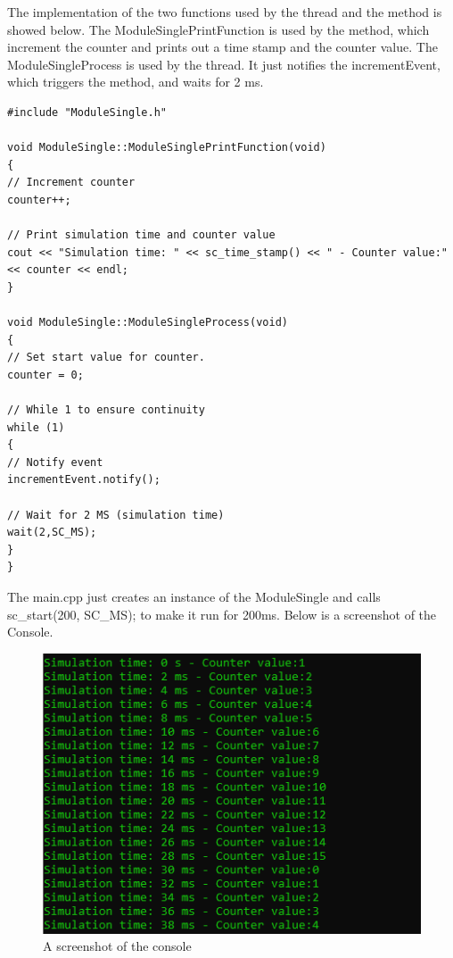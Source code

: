 The implementation of the two functions used by the thread and the method is showed below. 
The ModuleSinglePrintFunction is used by the method, which increment the counter and prints out a time stamp and the counter value.
The ModuleSingleProcess  is used by the thread. It just notifies the incrementEvent, which triggers the method, and waits for 2 ms. 

\begin{lstlisting}
#include "ModuleSingle.h"

void ModuleSingle::ModuleSinglePrintFunction(void)
{
// Increment counter
counter++;

// Print simulation time and counter value
cout << "Simulation time: " << sc_time_stamp() << " - Counter value:" << counter << endl;
}

void ModuleSingle::ModuleSingleProcess(void)
{
// Set start value for counter.
counter = 0;

// While 1 to ensure continuity
while (1)
{
// Notify event
incrementEvent.notify();

// Wait for 2 MS (simulation time)
wait(2,SC_MS);
}
}
\end{lstlisting}


The main.cpp just creates an instance of the ModuleSingle and calls sc\_start(200, SC\_MS); to make it run for 200ms. 
Below is a screenshot of the Console.

\begin{figure}[H]
	\centering
	\includegraphics[width=\textwidth]{Images/ConsoleWindow3_1.png}
	\caption{A screenshot of the console}
	\label{fig:ConsoleWindow_3_1}
\end{figure}

